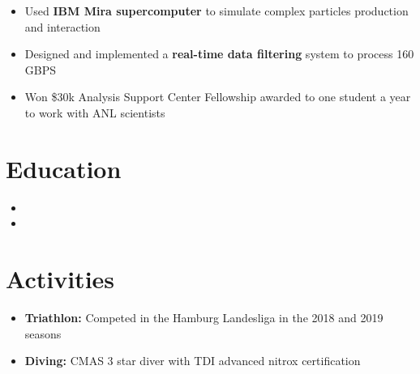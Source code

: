 \documentclass{myfancycv}
\begin{document}
\begin{itemize}
\vspace*{-0.5em}
{
{\begin{itemize}\setlength\itemindent{-2.2em}
\item Used {\bf IBM Mira supercomputer} to simulate complex particles production and interaction
\item Designed and implemented a {\bf real-time data filtering} system to process 160 GBPS
\item Won \$30k Analysis Support Center Fellowship awarded to one student a year to work with ANL scientists
\end{itemize}}%
}

\end{itemize}

\section{Education}
  \vspace*{-0.5em}

\begin{itemize}
\item{}
\item{}
\end{itemize}

  \vspace*{-0.9em}
\section{Activities}

\begin{itemize}
  \vspace*{-0.5em}
	\item {\bf Triathlon:} Competed in the Hamburg Landesliga in the 2018 and 2019 seasons
	\item {\bf Diving:} CMAS 3 star diver with TDI advanced nitrox certification
\end{itemize}
\end{document}
